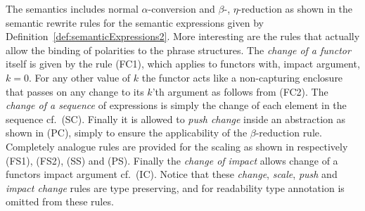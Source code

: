The semantics includes normal $\alpha$-conversion and $\beta$-, $\eta$-reduction as shown in the semantic rewrite rules for the semantic expressions given by Definition~\ref{def:semanticExpressions2}. More interesting are the rules that actually allow the binding of polarities to the phrase structures. The \emph{change of a functor} itself is given by the rule (FC1), which applies to functors with, impact argument, $k = 0$. For any other value of $k$ the functor acts like a non-capturing enclosure that passes on any change to its $k$'th argument as follows from (FC2). The \emph{change of a sequence} of expressions is simply the change of each element in the sequence cf.\ (SC). Finally it is allowed to \emph{push change} inside an abstraction as shown in (PC), simply to ensure the applicability of the $\beta$-reduction rule. Completely analogue rules are provided for the scaling as shown in respectively (FS1), (FS2), (SS) and (PS). Finally the \emph{change of impact} allows change of a functors impact argument cf.\ (IC). %
Notice that these \emph{change}, \emph{scale}, \emph{push} and \emph{impact change} rules are type preserving, and for readability type annotation is omitted from these rules.

